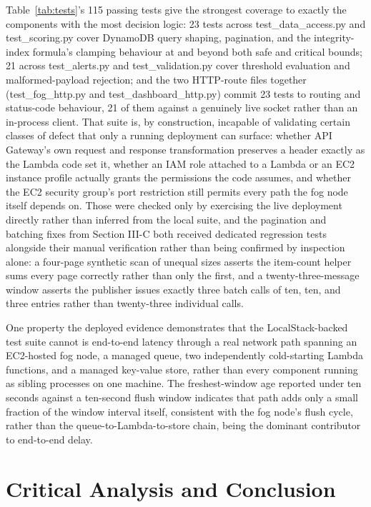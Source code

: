 \documentclass[conference]{IEEEtran}
\begin{document}
Table~\ref{tab:tests}'s 115 passing tests give the strongest coverage to exactly the components with the most decision logic: 23 tests across test\_data\_access.py and test\_scoring.py cover DynamoDB query shaping, pagination, and the integrity-index formula's clamping behaviour at and beyond both safe and critical bounds; 21 across test\_alerts.py and test\_validation.py cover threshold evaluation and malformed-payload rejection; and the two HTTP-route files together (test\_fog\_http.py and test\_dashboard\_http.py) commit 23 tests to routing and status-code behaviour, 21 of them against a genuinely live socket rather than an in-process client. That suite is, by construction, incapable of validating certain classes of defect that only a running deployment can surface: whether API Gateway's own request and response transformation preserves a header exactly as the Lambda code set it, whether an IAM role attached to a Lambda or an EC2 instance profile actually grants the permissions the code assumes, and whether the EC2 security group's port restriction still permits every path the fog node itself depends on. Those were checked only by exercising the live deployment directly rather than inferred from the local suite, and the pagination and batching fixes from Section III-C both received dedicated regression tests alongside their manual verification rather than being confirmed by inspection alone: a four-page synthetic scan of unequal sizes asserts the item-count helper sums every page correctly rather than only the first, and a twenty-three-message window asserts the publisher issues exactly three batch calls of ten, ten, and three entries rather than twenty-three individual calls.

One property the deployed evidence demonstrates that the LocalStack-backed test suite cannot is end-to-end latency through a real network path spanning an EC2-hosted fog node, a managed queue, two independently cold-starting Lambda functions, and a managed key-value store, rather than every component running as sibling processes on one machine. The freshest-window age reported under ten seconds against a ten-second flush window indicates that path adds only a small fraction of the window interval itself, consistent with the fog node's flush cycle, rather than the queue-to-Lambda-to-store chain, being the dominant contributor to end-to-end delay.

\section{Critical Analysis and Conclusion}
\end{document}
